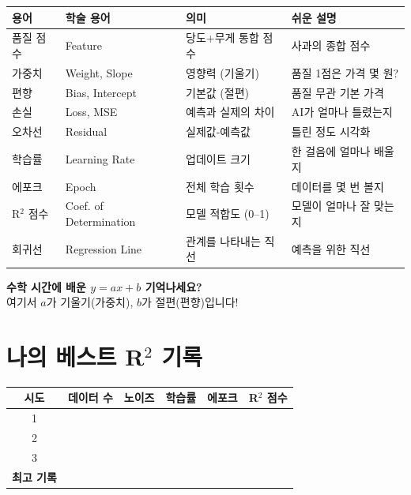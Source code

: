 \documentclass[11pt, a4paper]{article}
\begin{document}
\begin{center}
\small
\begin{tabular}{llp{4cm}p{4cm}}
    \toprule
    \textbf{용어} & \textbf{학술 용어} & \textbf{의미} & \textbf{쉬운 설명} \\
    \midrule
    품질 점수 & Feature & 당도+무게 통합 점수 & 사과의 종합 점수 \\
    가중치 & Weight, Slope & 영향력 (기울기) & 품질 1점은 가격 몇 원? \\
    편향 & Bias, Intercept & 기본값 (절편) & 품질 무관 기본 가격 \\
    손실 & Loss, MSE & 예측과 실제의 차이 & AI가 얼마나 틀렸는지 \\
    오차선 & Residual & 실제값-예측값 & 틀린 정도 시각화 \\
    학습률 & Learning Rate & 업데이트 크기 & 한 걸음에 얼마나 배울지 \\
    에포크 & Epoch & 전체 학습 횟수 & 데이터를 몇 번 볼지 \\
    R$^2$ 점수 & Coef. of Determination & 모델 적합도 (0--1) & 모델이 얼마나 잘 맞는지 \\
    회귀선 & Regression Line & 관계를 나타내는 직선 & 예측을 위한 직선 \\
    \bottomrule
\end{tabular}
\end{center}

\vspace{0.5cm}

\begin{tipbox}
\textbf{수학 시간에 배운 $y = ax + b$ 기억나세요?}\\
여기서 $a$가 기울기(가중치), $b$가 절편(편향)입니다!
\end{tipbox}

\section{ 나의 베스트 R$^2$ 기록}

\begin{center}
\begin{tabular}{cccccc}
    \toprule
    \textbf{시도} & \textbf{데이터 수} & \textbf{노이즈} & \textbf{학습률} & \textbf{에포크} & \textbf{R$^2$ 점수} \\
    \midrule
    1 & \hspace{1.5cm} & \hspace{1.2cm} & \hspace{1.2cm} & \hspace{1.2cm} & \hspace{1.5cm} \\[0.5cm]
    2 & & & & & \\[0.5cm]
    3 & & & & & \\[0.5cm]
    \midrule
    \textbf{최고 기록} & & & & & \\[0.3cm]
    \bottomrule
\end{tabular}
\end{center}
\end{document}
